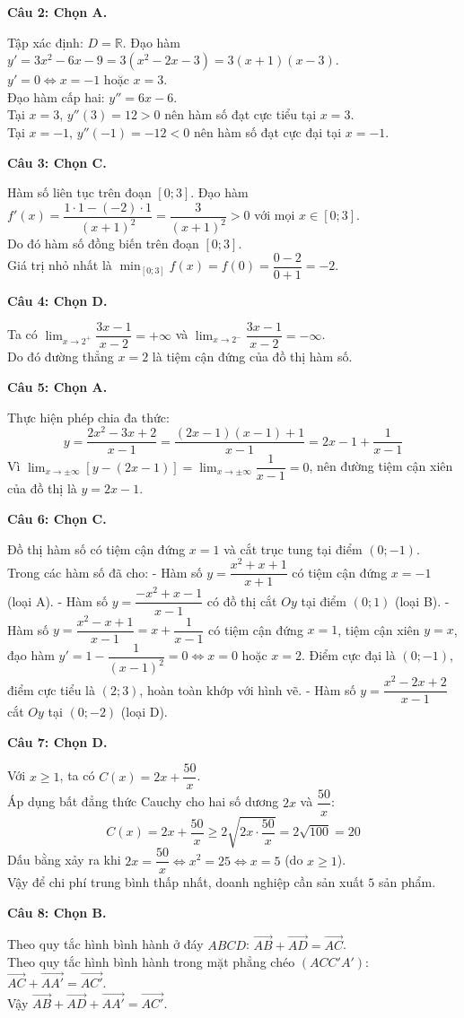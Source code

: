 \documentclass[12pt,a4paper]{article}
\newcommand{\loigiai}[1]{\par\medskip\Needspace{4\baselineskip}\noindent\textbf{#1}\par\nobreak}
\begin{document}
\loigiai{Câu 2: Chọn A.}
Tập xác định: $D=\mathbb R$. Đạo hàm $y'=3x^2-6x-9=3(x^2-2x-3)=3(x+1)(x-3)$.\\
$y'=0\iff x=-1$ hoặc $x=3$.\\
Đạo hàm cấp hai: $y''=6x-6$.\\
Tại $x=3$, $y''(3)=12>0$ nên hàm số đạt cực tiểu tại $x=3$.\\
Tại $x=-1$, $y''(-1)=-12<0$ nên hàm số đạt cực đại tại $x=-1$.

\loigiai{Câu 3: Chọn C.}
Hàm số liên tục trên đoạn $[0;3]$. Đạo hàm $f'(x)=\dfrac{1\cdot1-(-2)\cdot1}{(x+1)^2}=\dfrac{3}{(x+1)^2}>0$ với mọi $x\in[0;3]$.\\
Do đó hàm số đồng biến trên đoạn $[0;3]$.\\
Giá trị nhỏ nhất là $\min_{[0;3]}f(x)=f(0)=\dfrac{0-2}{0+1}=-2$.

\loigiai{Câu 4: Chọn D.}
Ta có $\lim_{x\to2^+}\dfrac{3x-1}{x-2}=+\infty$ và $\lim_{x\to2^-}\dfrac{3x-1}{x-2}=-\infty$.\\
Do đó đường thẳng $x=2$ là tiệm cận đứng của đồ thị hàm số.

\loigiai{Câu 5: Chọn A.}
Thực hiện phép chia đa thức:
\[ y=\dfrac{2x^2-3x+2}{x-1}=\dfrac{(2x-1)(x-1)+1}{x-1}=2x-1+\dfrac{1}{x-1} \]
Vì $\lim_{x\to\pm\infty}[y-(2x-1)]=\lim_{x\to\pm\infty}\dfrac{1}{x-1}=0$, nên đường tiệm cận xiên của đồ thị là $y=2x-1$.

\loigiai{Câu 6: Chọn C.}
Đồ thị hàm số có tiệm cận đứng $x=1$ và cắt trục tung tại điểm $(0;-1)$.\\
Trong các hàm số đã cho:
- Hàm số $y=\dfrac{x^2+x+1}{x+1}$ có tiệm cận đứng $x=-1$ (loại A).
- Hàm số $y=\dfrac{-x^2+x-1}{x-1}$ có đồ thị cắt $Oy$ tại điểm $(0;1)$ (loại B).
- Hàm số $y=\dfrac{x^2-x+1}{x-1}=x+\dfrac{1}{x-1}$ có tiệm cận đứng $x=1$, tiệm cận xiên $y=x$, đạo hàm $y'=1-\dfrac{1}{(x-1)^2}=0\iff x=0$ hoặc $x=2$. Điểm cực đại là $(0;-1)$, điểm cực tiểu là $(2;3)$, hoàn toàn khớp với hình vẽ.
- Hàm số $y=\dfrac{x^2-2x+2}{x-1}$ cắt $Oy$ tại $(0;-2)$ (loại D).

\loigiai{Câu 7: Chọn D.}
Với $x\ge1$, ta có $C(x)=2x+\dfrac{50}{x}$.\\
Áp dụng bất đẳng thức Cauchy cho hai số dương $2x$ và $\dfrac{50}{x}$:
\[ C(x)=2x+\dfrac{50}{x}\ge2\sqrt{2x\cdot\dfrac{50}{x}}=2\sqrt{100}=20 \]
Dấu bằng xảy ra khi $2x=\dfrac{50}{x}\iff x^2=25\iff x=5$ (do $x\ge1$).\\
Vậy để chi phí trung bình thấp nhất, doanh nghiệp cần sản xuất $5$ sản phẩm.

\loigiai{Câu 8: Chọn B.}
Theo quy tắc hình bình hành ở đáy $ABCD$: $\overrightarrow{AB}+\overrightarrow{AD}=\overrightarrow{AC}$.\\
Theo quy tắc hình bình hành trong mặt phẳng chéo $(ACC'A')$: $\overrightarrow{AC}+\overrightarrow{AA'}=\overrightarrow{AC'}$.\\
Vậy $\overrightarrow{AB}+\overrightarrow{AD}+\overrightarrow{AA'}=\overrightarrow{AC'}$.
\end{document}
